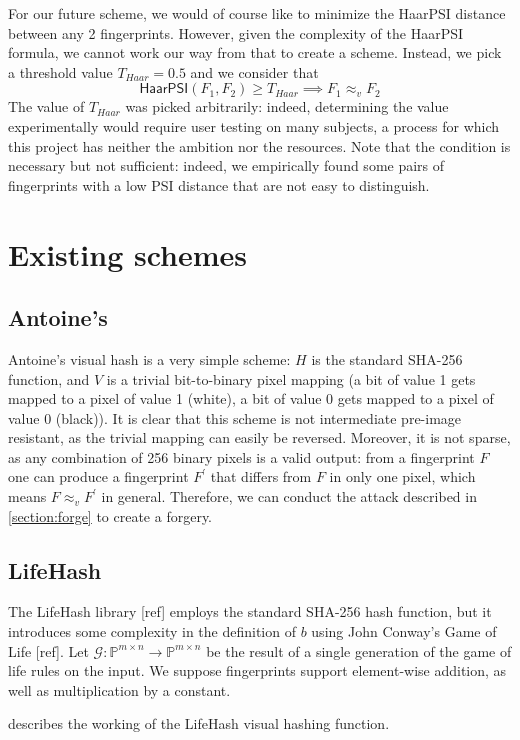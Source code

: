 \documentclass{article}
\newcommand{\vis}{\approx_v}
\begin{document}
For our future scheme, we would of course like to minimize the HaarPSI distance between any 2 fingerprints. However, given the complexity of the HaarPSI formula, we cannot work our way from that to create a scheme. Instead, we pick a threshold value $T_{Haar} = 0.5$ and we consider that $$\mathsf{HaarPSI}(F_1,F_2) \geq T_{Haar} \implies F_1 \vis F_2$$
The value of $T_{Haar}$ was picked arbitrarily: indeed, determining the value experimentally would require user testing on many subjects, a process for which this project has neither the ambition nor the resources. Note that the condition is necessary but not sufficient: indeed, we empirically found some pairs of fingerprints with a low PSI distance that are not easy to distinguish.


\section{Existing schemes}
\subsection{Antoine's}
Antoine's visual hash is a very simple scheme: $H$ is the standard SHA-256 function, and $V$ is a trivial bit-to-binary pixel mapping (a bit of value 1 gets mapped to a pixel of value 1 (white), a bit of value 0 gets mapped to a pixel of value 0 (black)). It is clear that this scheme is not intermediate pre-image resistant, as the trivial mapping can easily be reversed. Moreover, it is not sparse, as any combination of 256 binary pixels is a valid output: from a fingerprint $F$ one can produce a fingerprint $F^\prime$ that differs from $F$ in only one pixel, which means $F \vis F^\prime$ in general. Therefore, we can conduct the attack described in \cref{section:forge} to create a forgery.
\subsection{LifeHash}
The LifeHash library [ref] employs the standard SHA-256 hash function, but it introduces some complexity in the definition of $b$ using John Conway's Game of Life [ref]. Let $\mathcal{G} : \mathbb P^{m \times n} \rightarrow \mathbb P ^{m \times n}$ be the result of a single generation of the game of life rules on the input. We suppose fingerprints support element-wise addition, as well as multiplication by a constant.

 describes the working of the LifeHash visual hashing function.
\end{document}
